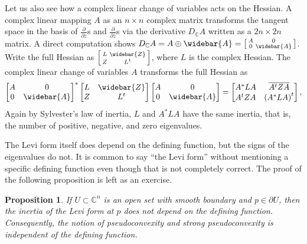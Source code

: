 \documentclass[12pt,openany]{book}
\newcommand{\C}{{\mathbb{C}}}
\theoremstyle{plain}
\newtheorem{prop}[thm]{Proposition}
\theoremstyle{remark}
\theoremstyle{definition}
\theoremstyle{exercise}
\theoremstyle{example}
\begin{document}
Let us also see how a complex linear change of variables
acts on the Hessian.  A complex linear mapping $A$ as
an $n \times n$ complex matrix
transforms the tangent space
in the basis of $\frac{\partial}{\partial z}$s and
$\frac{\partial}{\partial \bar{z}}$s
via the derivative $D_{\C} A$ written as a $2n \times 2n$ matrix.
A direct computation shows $D_{\C} A = A \oplus \widebar{A} =
\left[ \begin{smallmatrix} A & 0 \\ 0 & \widebar{A} \end{smallmatrix}
\right]$.
Write the full Hessian as
$\left[ \begin{smallmatrix} L & \widebar{Z} \\ Z & L^t \end{smallmatrix}
\right]$, where $L$ is the complex Hessian.  The complex linear change
of variables $A$ transforms
the full Hessian as
\begin{equation*}
{\begin{bmatrix} A & 0 \\ 0 & \widebar{A} \end{bmatrix}}^*
\begin{bmatrix} L & \widebar{Z} \\ Z & L^t \end{bmatrix}
\begin{bmatrix} A & 0 \\ 0 & \widebar{A} \end{bmatrix}
=
\begin{bmatrix} A^*LA & \overline{A^tZA} \\ A^tZA & {(A^*LA)}^t \end{bmatrix} ,
\end{equation*}
Again by Sylvester's law of inertia,
$L$ and $A^*LA$ have the same inertia, that is,
the number of positive, negative, and zero eigenvalues.

The Levi form itself does depend on the defining function, but the signs of
the eigenvalues do not.  It is common to say ``the
Levi form'' without mentioning a specific defining function
even though that is not completely correct.
The proof of the following proposition is left as an exercise.

\begin{prop} \label{prop:inertiainvariant}
If $U \subset \C^n$ is an open set with smooth boundary and $p \in \partial
U$, then the inertia of the Levi form at $p$
does not depend on the defining function.
Consequently, the notion of pseudoconvexity and strong pseudoconvexity is
independent of the defining function.
\end{prop}
\end{document}
